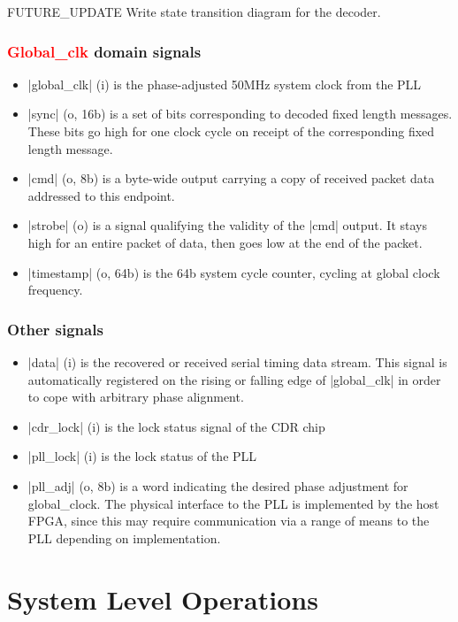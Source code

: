 \documentclass[a4paper,11pt]{article}
\begin{document}
{\color{red}FUTURE\_UPDATE} Write state transition diagram for the decoder.

\subsubsection{\textcolor{red}{Global\_clk} domain signals}

\begin{itemize}
	\item |global_clk| (i) is the phase-adjusted 50MHz system clock from the PLL
	\item |sync| (o, 16b) is a set of bits corresponding to decoded fixed length messages. These bits go high for one clock cycle on receipt of the corresponding fixed length message.
	\item |cmd| (o, 8b) is a byte-wide output carrying a copy of received packet data addressed to this endpoint.
	\item |strobe| (o) is a signal qualifying the validity of the |cmd| output. It stays high for an entire packet of data, then goes low at the end of the packet.
	\item |timestamp| (o, 64b) is the 64b system cycle counter, cycling at global clock frequency.
\end{itemize}

\subsubsection{Other signals}

\begin{itemize}
	\item |data| (i) is the recovered or received serial timing data stream. This signal is automatically registered on the rising or falling edge of |global_clk| in order to cope with arbitrary phase alignment.
	\item |cdr_lock| (i) is the lock status signal of the CDR chip
	\item |pll_lock| (i) is the lock status of the PLL
	\item |pll_adj| (o, 8b) is a word indicating the desired phase adjustment for global\_clock. The physical interface to the PLL is implemented by the host FPGA, since this may require communication via a range of means to the PLL depending on implementation.
\end{itemize}

\section{System Level Operations}
\end{document}

